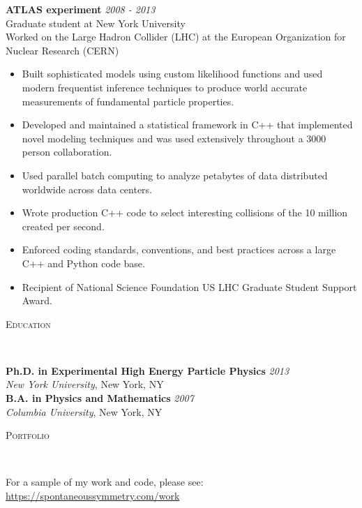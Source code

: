 \documentclass[9pt]{article}
\newenvironment{changemargin}[2]{%
  \begin{list}{}{%
    \setlength{\topsep}{0pt}%
    \setlength{\leftmargin}{#1}%
    \setlength{\rightmargin}{#2}%
    \setlength{\listparindent}{\parindent}%
    \setlength{\itemindent}{\parindent}%
    \setlength{\parsep}{\parskip}%
  }%
  \item[]}{\end{list}
}
\newcommand{\lineover}{
  \begin{changemargin}{-0.05in}{-0.05in}
    \vspace*{-8pt}
    \hrulefill \\
    \vspace*{-2pt}
  \end{changemargin}
}
\newcommand{\header}[1]{
  \begin{changemargin}{-0.5in}{-0.5in}
    \scshape{#1}\\
    \lineover
  \end{changemargin}
}
\newenvironment{body} {
  \vspace*{-16pt}
\begin{changemargin}{-0.25in}{-0.5in}
  }
{\end{changemargin}
}
\begin{document}
\begin{body}
        \medskip

        \textbf{ATLAS experiment} \hfill \emph{2008 - 2013}\\
        Graduate student at New York University \\
        Worked on the Large Hadron Collider (LHC) at the European Organization for Nuclear Research (CERN) \\
        \medskip

        \begin{itemize}

        \item Built sophisticated models using custom likelihood functions and used modern frequentist inference techniques to produce world accurate measurements of fundamental particle properties.

        \item Developed and maintained a statistical framework in C++ that implemented novel modeling techniques and was used extensively throughout a 3000 person collaboration.

        \item Used parallel batch computing to analyze petabytes of data distributed worldwide across data centers.

        \item Wrote production C++ code to select interesting collisions of the 10 million created per second.

        \item Enforced coding standards, conventions, and best practices across a large C++ and Python code base.

        \item Recipient of National Science Foundation US LHC Graduate Student Support Award.

        \end{itemize}

\end{body}

\smallskip

\header{Education}

\begin{body}
  \vspace{14pt}
  \textbf{Ph.D. in Experimental High Energy Particle Physics }{} \hfill \emph{2013}{} \\
  \emph{New York University}, New York, NY{} \\
  \medskip
  \textbf{B.A. in Physics and Mathematics} \hfill \emph{2007} \\
  \emph{Columbia University}, New York, NY\\
\end{body}


\header{Portfolio}

\begin{body}
  \vspace{14pt}
  For a sample of my work and code, please see: {\url{https://spontaneoussymmetry.com/work}}
\end{body}
\end{document}
